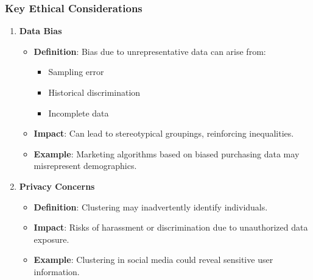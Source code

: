 \documentclass[aspectratio=169]{beamer}
\begin{document}
\begin{frame}[fragile]
    \frametitle{Key Ethical Considerations}
    \begin{enumerate}
        \item \textbf{Data Bias}
        \begin{itemize}
            \item \textbf{Definition}: Bias due to unrepresentative data can arise from:
            \begin{itemize}
                \item Sampling error
                \item Historical discrimination
                \item Incomplete data
            \end{itemize}
            \item \textbf{Impact}: Can lead to stereotypical groupings, reinforcing inequalities.
            \item \textbf{Example}: Marketing algorithms based on biased purchasing data may misrepresent demographics.
        \end{itemize}
        
        \item \textbf{Privacy Concerns}
        \begin{itemize}
            \item \textbf{Definition}: Clustering may inadvertently identify individuals.
            \item \textbf{Impact}: Risks of harassment or discrimination due to unauthorized data exposure.
            \item \textbf{Example}: Clustering in social media could reveal sensitive user information.
        \end{itemize}
    \end{enumerate}
\end{frame}
\end{document}
